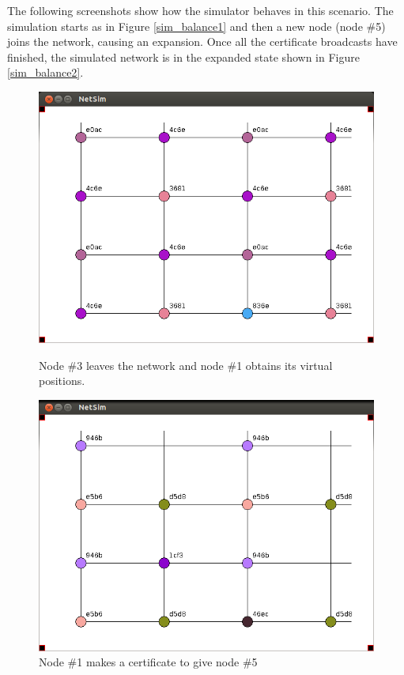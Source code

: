 \documentclass[ %
                    author={Luke Murray},
                supervisor={Dr. Simon Hollis},
                     title={Shadow Peer-to-Peer Networks},
                  subtitle={},
                    degree={MEng},
                      year={2013} ]{thesis}
\begin{document}
The following screenshots show how the simulator behaves in this scenario. The simulation starts as in Figure \ref{sim_balance1} and then a new node (node \#5) joins the network, causing an expansion. Once all the certificate broadcasts have finished, the simulated network is in the expanded state shown in Figure \ref{sim_balance2}.

\begin{figure}[h]
    \centering
    \begin{minipage}[b]{0.45\linewidth}
        \centering
        \includegraphics[width=\linewidth]{sim_pics/balance_6.png}
        \caption{Node \#3 leaves the network and node \#1 obtains its virtual positions.}
        \label{sim_balance3}
    \end{minipage}
    \hspace{0.5cm}
    \begin{minipage}[b]{0.45\linewidth}
        \centering
        \includegraphics[width=\linewidth]{sim_pics/expand_7.png}
        \caption{Node \#1 makes a certificate to give node \#5}
        \label{sim_balance4}
    \end{minipage}
\end{figure}
\end{document}
